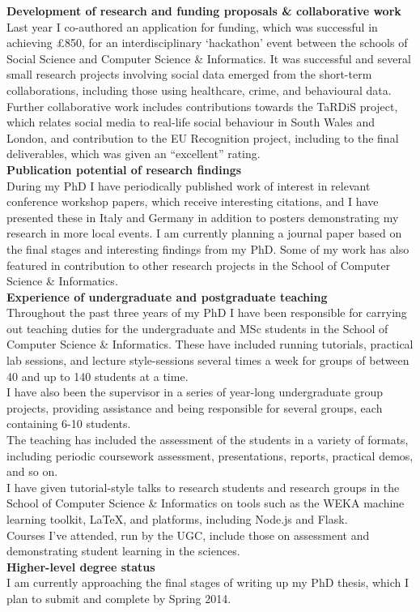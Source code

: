\documentclass[11pt,a4paper]{article}
\begin{document}
\textbf{Development of research and funding proposals \& collaborative work}\\
Last year I co-authored an application for funding, which was successful in achieving £850, for an interdisciplinary `hackathon' event between the schools of Social Science and Computer Science \& Informatics. It was successful and several small research projects involving social data emerged from the short-term collaborations, including those using healthcare, crime, and behavioural data.\\
Further collaborative work includes contributions towards the TaRDiS project, which relates social media to real-life social behaviour in South Wales and London, and contribution to the EU Recognition project, including to the final deliverables, which was given an ``excellent'' rating.\\

\textbf{Publication potential of research findings}\\
During my PhD I have periodically published work of interest in relevant conference workshop papers, which receive interesting citations, and I have presented these in Italy and Germany in addition to posters demonstrating my research in more local events. I am currently planning a journal paper based on the final stages and interesting findings from my PhD. Some of my work has also featured in contribution to other research projects in the School of Computer Science \& Informatics.\\

\textbf{Experience of undergraduate and postgraduate teaching}\\
Throughout the past three years of my PhD I have been responsible for carrying out teaching duties for the undergraduate and MSc students in the School of Computer Science \& Informatics. These have included running tutorials, practical lab sessions, and lecture style-sessions several times a week for groups of between 40 and up to 140 students at a time.\\
I have also been the supervisor in a series of year-long undergraduate group projects, providing assistance and being responsible for several groups, each containing 6-10 students.\\
The teaching has included the assessment of the students in a variety of formats, including periodic coursework assessment, presentations, reports, practical demos, and so on.\\
I have given tutorial-style talks to research students and research groups in the School of Computer Science \& Informatics on tools such as the WEKA machine learning toolkit, \LaTeX, and platforms, including Node.js and Flask.\\
Courses I've attended, run by the UGC, include those on assessment and demonstrating student learning in the sciences.\\

\textbf{Higher-level degree status}\\
I am currently approaching the final stages of writing up my PhD thesis, which I plan to submit and complete by Spring 2014.
\end{document}
